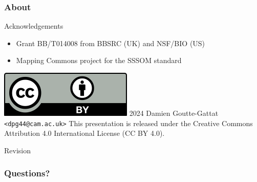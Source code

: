 \begin{frame}
  \frametitle{About}

  \begin{block}{Acknowledgements}
    \begin{itemize}
      \item Grant BB/T014008 from BBSRC (UK) and NSF/BIO (US)
      \item Mapping Commons project for the SSSOM standard
    \end{itemize}
  \end{block}

  \begin{block}{\includegraphics[scale=.26]{ccby}\hspace{.2em}%
    2024 Damien Goutte-Gattat \texttt{<dpg44@cam.ac.uk>}}
    This presentation is released under the Creative Commons Attribution
    4.0 International License (CC BY 4.0).
  \end{block}

  \begin{block}{Revision}\ttfamily\scriptsize
    
  \end{block}
\end{frame}

\appendix
\begin{frame}[noframenumbering]
  \frametitle{Questions?}
\end{frame}



